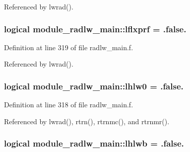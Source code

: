 Referenced by lwrad().

\subsubsection[{\texorpdfstring{lflxprf}{lflxprf}}]{\setlength{\rightskip}{0pt plus 5cm}logical module\+\_\+radlw\+\_\+main\+::lflxprf = .false.\hspace{0.3cm}{\ttfamily [private]}}\hypertarget{namespacemodule__radlw__main_aec461dc1a50b326daa15c57c7dc55602}{}\label{namespacemodule__radlw__main_aec461dc1a50b326daa15c57c7dc55602}


Definition at line 319 of file radlw\+\_\+main.\+f.



Referenced by lwrad().

\subsubsection[{\texorpdfstring{lhlw0}{lhlw0}}]{\setlength{\rightskip}{0pt plus 5cm}logical module\+\_\+radlw\+\_\+main\+::lhlw0 = .false.\hspace{0.3cm}{\ttfamily [private]}}\hypertarget{namespacemodule__radlw__main_a7f8818436b81efe586d83b2f03b1617f}{}\label{namespacemodule__radlw__main_a7f8818436b81efe586d83b2f03b1617f}


Definition at line 318 of file radlw\+\_\+main.\+f.



Referenced by lwrad(), rtrn(), rtrnmc(), and rtrnmr().

\subsubsection[{\texorpdfstring{lhlwb}{lhlwb}}]{\setlength{\rightskip}{0pt plus 5cm}logical module\+\_\+radlw\+\_\+main\+::lhlwb = .false.\hspace{0.3cm}{\ttfamily [private]}}\hypertarget{namespacemodule__radlw__main_a40b8a6f612a53e0a768cf922aa6f73c3}{}\label{namespacemodule__radlw__main_a40b8a6f612a53e0a768cf922aa6f73c3}


